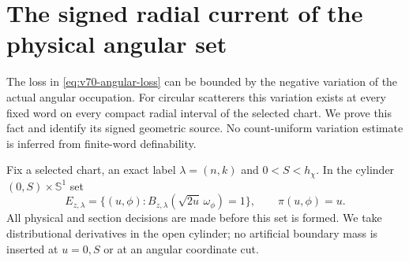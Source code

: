 \section{The signed radial current of the physical angular set}
\label{sec:v70-radial-current}
The loss in \eqref{eq:v70-angular-loss} can be bounded by the
negative variation of the actual angular occupation. For circular
scatterers this variation exists at every fixed word on every compact
radial interval of the selected chart. We prove this fact and identify
its signed geometric source. No count-uniform variation estimate is
inferred from finite-word definability.

Fix a selected chart, an exact label $\lambda=(n,k)$ and
$0<S<h_\chi$. In the cylinder $(0,S)\times\mathbb S^1$ set
\[
 E_{z,\lambda}=
 \{(u,\phi):B_{z,\lambda}(\sqrt{2u}\,\omega_\phi)=1\},
 \qquad \pi(u,\phi)=u.
\]
All physical and section decisions are made before this set is formed.
We take distributional derivatives in the open cylinder; no artificial
boundary mass is inserted at $u=0,S$ or at an angular coordinate cut.

